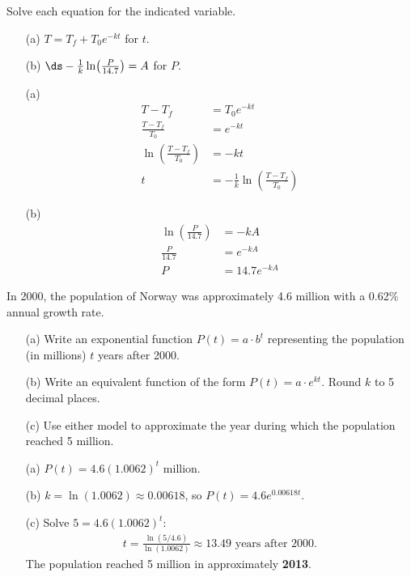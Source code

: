 \documentclass{ximera}
\begin{document}
\begin{problem}
Solve each equation for the indicated variable.
\begin{enumerate}
  \item[(a)] $T = T_f + T_0 e^{-kt}$ for $t$.
  \medskip
  \item[(b)] $\ds-\frac{1}{k}\ln\!\left(\frac{P}{14.7}\right) = A$ for $P$.
\end{enumerate}

\begin{solution}
\begin{enumerate}
  \item[(a)]
  \begin{align*}
    T - T_f &= T_0 e^{-kt}\\
    \frac{T-T_f}{T_0} &= e^{-kt}\\
    \ln\!\left(\frac{T-T_f}{T_0}\right) &= -kt\\
    t &= -\frac{1}{k}\ln\!\left(\frac{T-T_f}{T_0}\right)
  \end{align*}

  \item[(b)]
  \begin{align*}
    \ln\!\left(\frac{P}{14.7}\right) &= -kA\\
    \frac{P}{14.7} &= e^{-kA}\\
    P &= 14.7e^{-kA}
  \end{align*}
\end{enumerate}
\end{solution}
\end{problem}


\begin{problem}
In 2000, the population of Norway was approximately 4.6 million with a 0.62\% annual growth rate.
\begin{enumerate}
  \item[(a)] Write an exponential function $P(t) = a\cdot b^t$ representing the population (in millions) $t$ years after 2000.
  \medskip
  \item[(b)] Write an equivalent function of the form $P(t)=a\cdot e^{kt}$. Round $k$ to 5 decimal places.
  \medskip
  \item[(c)] Use either model to approximate the year during which the population reached 5 million.
\end{enumerate}

\begin{solution}
\begin{enumerate}
  \item[(a)] $P(t) = 4.6(1.0062)^t$ million.

  \item[(b)] $k = \ln(1.0062) \approx 0.00618$, so $P(t) = 4.6e^{0.00618t}$.

  \item[(c)] Solve $5 = 4.6(1.0062)^t$:
  \begin{align*}
    t = \frac{\ln(5/4.6)}{\ln(1.0062)} \approx 13.49 \text{ years after 2000.}
  \end{align*}
  The population reached 5 million in approximately \textbf{2013}.
\end{enumerate}
\end{solution}
\end{problem}
\end{document}
